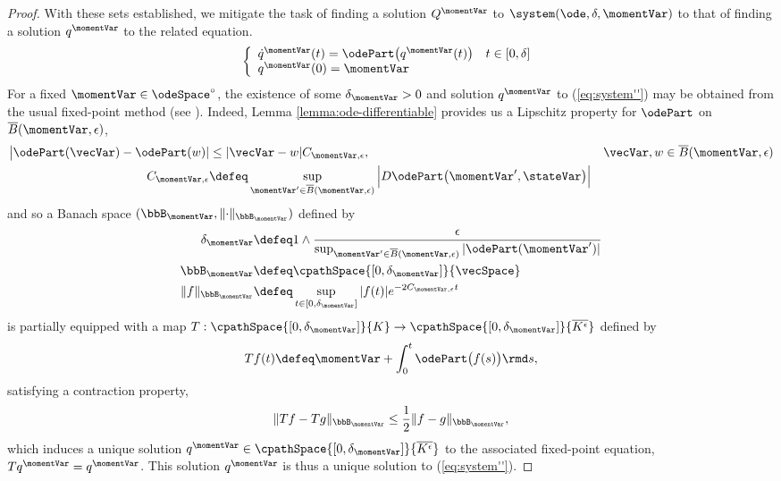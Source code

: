 \begin{proof}
  With these sets established, we mitigate the task of finding a solution $Q^\momentVar$ to $\system(\ode,\delta,\momentVar)$ to that of finding a solution $q^\momentVar$ to the related equation.
  \begin{equation}
    \label{eq:system''}
    \left\{\begin{array}{ll}
      \dot q^\momentVar(t) = \odePart\big(q^\momentVar(t)\big) & t \in [0,\delta] \\
      q^\momentVar(0) = \momentVar
    \end{array}\right. \\
  \end{equation}
  For a fixed $\momentVar \in \odeSpace^\circ$, the existence of some $\delta_\momentVar > 0$ and solution $q^\momentVar$ to (\ref{eq:system''}) may be obtained from the usual fixed-point method (see \cite[II.6 Theorem III]{walter1998}).
  Indeed, Lemma \ref{lemma:ode-differentiable} provides us a Lipschitz property for $\odePart$ on $\overline B(\momentVar, \epsilon)$,
  \begin{align}
    \big|\odePart(\vecVar) - \odePart(w)| 
    &\leq |\vecVar-w| C_{\momentVar,\epsilon},
    & \vecVar,w \in \overline B(\momentVar,\epsilon) \\
    C_{\momentVar,\epsilon} 
    &\defeq \sup_{\momentVar'\in\overline B(\momentVar,\epsilon)} \Big|D\odePart\big(\momentVar',\stateVar\big)\Big| 
  \end{align}
  and so a Banach space $(\bbB_\momentVar, \lVert\cdot\rVert_{\bbB_\momentVar})$ defined by
  \begin{align}
    \delta_\momentVar &\defeq 1 \wedge \frac{\epsilon}{\sup_{\momentVar' \in \overline B(\momentVar, \epsilon)} |\odePart(\momentVar')|} \\
    \bbB_\momentVar &\defeq \cpathSpace{[0,\delta_\momentVar]}{\vecSpace} \\
    \lVert f \rVert_{\bbB_\momentVar} &\defeq \sup_{t \in [0,\delta_\momentVar]} |f(t)| e^{-2C_{\momentVar,\epsilon}t}
  \end{align}
  is partially equipped with a map $T: \cpathSpace{[0,\delta_\momentVar]}{K} \rightarrow \cpathSpace{[0,\delta_\momentVar]}{\overline{K^\epsilon}}$ defined by
  \begin{equation}
    Tf(t) \defeq \momentVar + \int_0^t \odePart\big(f(s)\big) \rmd s,
  \end{equation}
  satisfying a contraction property,
  \begin{equation}
    \lVert Tf - Tg \rVert_{\bbB_\momentVar}
    \leq \frac{1}{2} \lVert f - g \rVert_{\bbB_\momentVar},
  \end{equation}
  which induces a unique solution $q^\momentVar \in \cpathSpace{[0,\delta_\momentVar]}{\overline{K^\epsilon}}$ to the associated fixed-point equation, $Tq^\momentVar = q^\momentVar$.
  This solution $q^\momentVar$ is thus a unique solution to (\ref{eq:system''}).


\end{proof}
